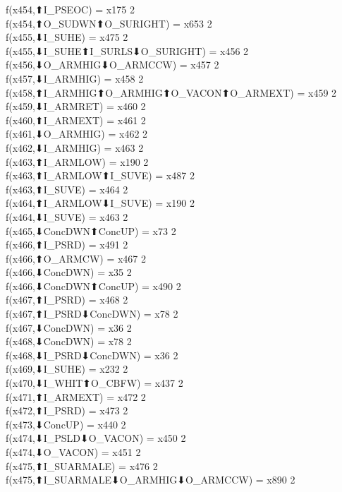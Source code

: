 f(x454,⬆I_PSEOC) = x175 {2} \\
f(x454,⬆O_SUDWN⬆O_SURIGHT) = x653 {2} \\
f(x455,⬇I_SUHE) = x475 {2} \\
f(x455,⬇I_SUHE⬆I_SURLS⬇O_SURIGHT) = x456 {2} \\
f(x456,⬇O_ARMHIG⬇O_ARMCCW) = x457 {2} \\
f(x457,⬇I_ARMHIG) = x458 {2} \\
f(x458,⬆I_ARMHIG⬆O_ARMHIG⬆O_VACON⬆O_ARMEXT) = x459 {2} \\
f(x459,⬇I_ARMRET) = x460 {2} \\
f(x460,⬆I_ARMEXT) = x461 {2} \\
f(x461,⬇O_ARMHIG) = x462 {2} \\
f(x462,⬇I_ARMHIG) = x463 {2} \\
f(x463,⬆I_ARMLOW) = x190 {2} \\
f(x463,⬆I_ARMLOW⬆I_SUVE) = x487 {2} \\
f(x463,⬆I_SUVE) = x464 {2} \\
f(x464,⬆I_ARMLOW⬇I_SUVE) = x190 {2} \\
f(x464,⬇I_SUVE) = x463 {2} \\
f(x465,⬇ConcDWN⬆ConcUP) = x73 {2} \\
f(x466,⬆I_PSRD) = x491 {2} \\
f(x466,⬆O_ARMCW) = x467 {2} \\
f(x466,⬇ConcDWN) = x35 {2} \\
f(x466,⬇ConcDWN⬆ConcUP) = x490 {2} \\
f(x467,⬆I_PSRD) = x468 {2} \\
f(x467,⬆I_PSRD⬇ConcDWN) = x78 {2} \\
f(x467,⬇ConcDWN) = x36 {2} \\
f(x468,⬇ConcDWN) = x78 {2} \\
f(x468,⬇I_PSRD⬇ConcDWN) = x36 {2} \\
f(x469,⬇I_SUHE) = x232 {2} \\
f(x470,⬇I_WHIT⬆O_CBFW) = x437 {2} \\
f(x471,⬆I_ARMEXT) = x472 {2} \\
f(x472,⬆I_PSRD) = x473 {2} \\
f(x473,⬇ConcUP) = x440 {2} \\
f(x474,⬇I_PSLD⬇O_VACON) = x450 {2} \\
f(x474,⬇O_VACON) = x451 {2} \\
f(x475,⬆I_SUARMALE) = x476 {2} \\
f(x475,⬆I_SUARMALE⬇O_ARMHIG⬇O_ARMCCW) = x890 {2} \\
